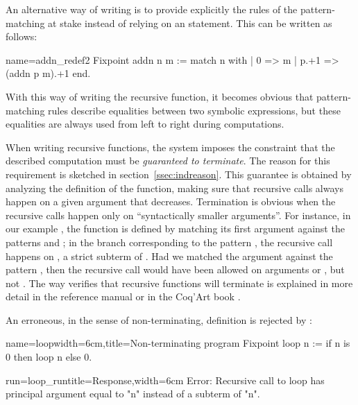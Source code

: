 An alternative way of writing  is to provide explicitly the
rules of the pattern-matching at stake instead of relying on an 
statement. This can be written as follows:

\begin{coq}{name=addn_redef2}{}
Fixpoint addn n m :=
  match n with
  | 0 => m
  | p.+1 => (addn p m).+1
  end.
\end{coq}
With this way of writing the recursive function, it becomes obvious that
pattern-matching rules describe equalities between two symbolic
expressions, but these equalities are always used from left to right during
computations.

When writing recursive functions, the \Coq{} system imposes the
constraint that the described computation must be \emph{guaranteed to
terminate}.  The reason for this requirement is sketched in
section~\ref{ssec:indreason}.
This guarantee is obtained by analyzing the definition of the
function, making sure that recursive calls always happen on a
given argument that decreases.
Termination is obvious when the recursive calls happen
only on ``syntactically smaller arguments''. For instance, in our
example , the function is defined by matching its first
argument  against the patterns  and ; in the branch
corresponding to the pattern , the recursive call happens on
, a strict subterm of . Had we matched the argument 
against the pattern , then the recursive call would have been
allowed on arguments  or , but not .  The way
\Coq{} verifies that recursive functions will terminate is
explained in more detail in the reference manual \cite{Coq:manual} or in the
Coq'Art book \cite{BC04}.


An erroneous, in the sense of non-terminating,
definition is rejected by \Coq{}:

\begin{coq-left}{name=loop}{width=6cm,title=Non-terminating program}
Fixpoint loop n :=
 if n is 0 then loop n else 0.
$~$
\end{coq-left}
\begin{coqout-right}{run=loop_run}{title=Response,width=6cm}
Error: Recursive call to loop has
principal argument equal to "n"
instead of a subterm of "n".
\end{coqout-right}

